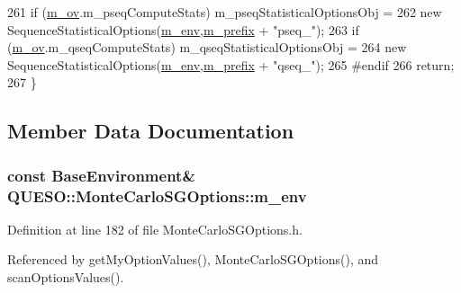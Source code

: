 \begin{DoxyCode}
261 \textcolor{preprocessor}{}  \textcolor{keywordflow}{if} (\hyperlink{class_q_u_e_s_o_1_1_monte_carlo_s_g_options_a4bc6849a41ede87425cad9ab6e97df11}{m\_ov}.m\_pseqComputeStats) m\_pseqStatisticalOptionsObj =
262     \textcolor{keyword}{new} SequenceStatisticalOptions(\hyperlink{class_q_u_e_s_o_1_1_monte_carlo_s_g_options_a16b93142f6a249ccf1d07de964fec2ef}{m\_env},\hyperlink{class_q_u_e_s_o_1_1_monte_carlo_s_g_options_ac640fa60af7134d4113e9b7481a34f6c}{m\_prefix} + \textcolor{stringliteral}{"pseq\_"});
263   \textcolor{keywordflow}{if} (\hyperlink{class_q_u_e_s_o_1_1_monte_carlo_s_g_options_a4bc6849a41ede87425cad9ab6e97df11}{m\_ov}.m\_qseqComputeStats) m\_qseqStatisticalOptionsObj =
264     \textcolor{keyword}{new} SequenceStatisticalOptions(\hyperlink{class_q_u_e_s_o_1_1_monte_carlo_s_g_options_a16b93142f6a249ccf1d07de964fec2ef}{m\_env},\hyperlink{class_q_u_e_s_o_1_1_monte_carlo_s_g_options_ac640fa60af7134d4113e9b7481a34f6c}{m\_prefix} + \textcolor{stringliteral}{"qseq\_"});
265 \textcolor{preprocessor}{#endif}
266 \textcolor{preprocessor}{}  \textcolor{keywordflow}{return};
267 \}
\end{DoxyCode}


\subsection{Member Data Documentation}
\hypertarget{class_q_u_e_s_o_1_1_monte_carlo_s_g_options_a16b93142f6a249ccf1d07de964fec2ef}{
\subsubsection[{m\-\_\-env}]{\setlength{\rightskip}{0pt plus 5cm}const {\bf Base\-Environment}\& Q\-U\-E\-S\-O\-::\-Monte\-Carlo\-S\-G\-Options\-::m\-\_\-env\hspace{0.3cm}{\ttfamily [private]}}}\label{class_q_u_e_s_o_1_1_monte_carlo_s_g_options_a16b93142f6a249ccf1d07de964fec2ef}


Definition at line 182 of file Monte\-Carlo\-S\-G\-Options.\-h.



Referenced by get\-My\-Option\-Values(), Monte\-Carlo\-S\-G\-Options(), and scan\-Options\-Values().

